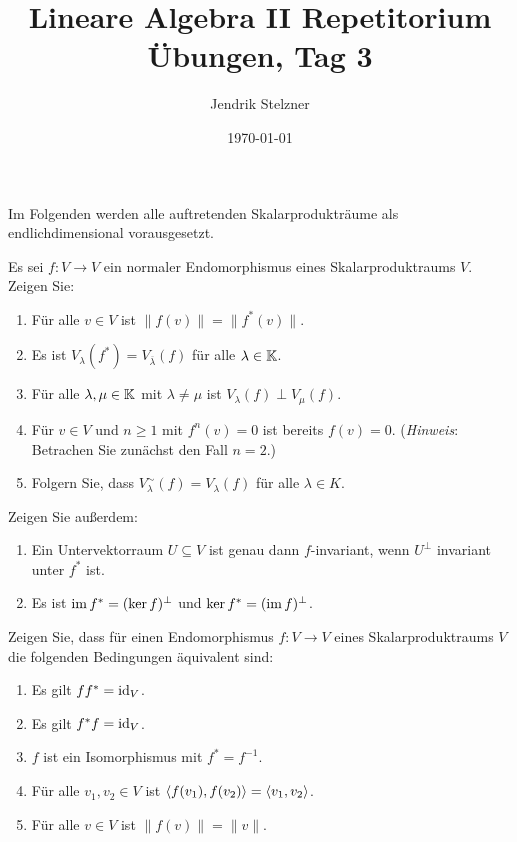 \documentclass[a4paper, 10pt]{scrartcl}
\title{Lineare Algebra II Repetitorium \\ Übungen, Tag 3}
\author{Jendrik Stelzner}
\date{\today}
\begin{document}
\maketitle


Im Folgenden werden alle auftretenden Skalarprodukträume als endlichdimensional vorausgesetzt.


\begin{question}
  Es sei $f \colon V \to V$ ein normaler Endomorphismus eines Skalarproduktraums $V$.
  Zeigen Sie:
  \begin{enumerate}[leftmargin=*]
    \item
      Für alle $v \in V$ ist $\|f(v)\| = \|f^*(v)\|$.
    \item
      Es ist $V_\lambda(f^*) = V_{\overline{\lambda}}(f)$ für alle $\lambda \in \mathbb{K}$.
    \item
      Für alle $\lambda, \mu \in \mathbb{K}$ mit $\lambda \neq \mu$ ist $V_\lambda(f) \perp V_\mu(f)$.
    \item
      Für $v \in V$ und $n \geq 1$ mit $f^n(v) = 0$ ist bereits $f(v) = 0$.
      (\emph{Hinweis}: Betrachen Sie zunächst den Fall $n = 2$.)
    \item
      Folgern Sie, dass $V^\sim_\lambda(f) = V_\lambda(f)$ für alle $\lambda \in K$.
  \end{enumerate}
  Zeigen Sie außerdem:
  \begin{enumerate}[leftmargin=*, resume]
    \item
      Ein Untervektorraum $U \subseteq V$ ist genau dann $f$-invariant, wenn $U^\perp$ invariant unter $f^*$ ist.
    \item
      Es ist $\operatorname{im} f^* = (\ker f)^\perp$ und $\ker f^* = (\operatorname{im} f)^\perp$.
  \end{enumerate}
\end{question}


\begin{question}
  Zeigen Sie, dass für einen Endomorphismus $f \colon V \to V$ eines Skalarproduktraums $V$ die folgenden Bedingungen äquivalent sind:
  \begin{enumerate}[leftmargin=*]
    \item
      Es gilt $f f^* = \operatorname{id}_V$.
    \item
      Es gilt $f^* f = \operatorname{id}_V$.
    \item
      $f$ ist ein Isomorphismus mit $f^* = f^{-1}$.
    \item
      Für alle $v_1, v_2 \in V$ ist $\left\langle f(v_1), f(v_2) \right\rangle = \left\langle v_1, v_2 \right\rangle$.
    \item
      Für alle $v \in V$ ist $\|f(v)\| = \|v\|$.
  \end{enumerate}
\end{question}
\end{document}

